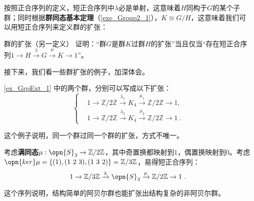 按照正合序列的定义，短正合序列中$\lambda$必是单射，这意味着$H$同构于$G$的某个子群；同时根据\textbf{群同态基本定理}（\autoref{exe_Group2_1}），$K\cong G/H$，这意味着我们可以用短正合序列来定义群的扩张：




\begin{exercise}{群的扩张（另一定义）}
证明：“群$G$是群$K$过群$H$的扩张”当且仅当“存在短正合序列$1\xrightarrow{}H\xrightarrow{\lambda}G\xrightarrow{\mu}K\xrightarrow{}1$”。
\end{exercise}



接下来，我们看一些群扩张的例子，加深体会。



\begin{example}{}

\autoref{ex_GrpExt_1} 中的两个群，分别可以写成以下扩张：
\begin{equation}
\left\{
\begin{aligned}
    &1\xrightarrow{}\mathbb{Z}/2\mathbb{Z}\xrightarrow{\lambda_1}K_4\xrightarrow{\mu_1}\mathbb{Z}/2\mathbb{Z}\xrightarrow{}1, \\
    &1\xrightarrow{}\mathbb{Z}/2\mathbb{Z}\xrightarrow{\lambda_2}K_4\xrightarrow{\mu_2}\mathbb{Z}/2\mathbb{Z}\xrightarrow{}1~. 
\end{aligned}
\right. 
\end{equation}

这个例子说明，同一个群过同一个群的扩张，方式不唯一。

\end{example}




\begin{example}{}
考虑\textbf{满同态}$\mu:\opn{S}_3\to\mathbb{Z}/2\mathbb{Z}$，其中奇置换都映射到$1$，偶置换映射到$0$。考虑$\opn{ker}\mu=\{(1), (1\ 2\ 3), (1\ 3\ 2)\}=\mathbb{Z}/3\mathbb{Z}$，易得短正合序列：
\begin{equation}
1\xrightarrow{}\mathbb{Z}/3\mathbb{Z}\xrightarrow{\lambda}\opn{S}_3\xrightarrow{\mu}\mathbb{Z}/2\mathbb{Z}\xrightarrow{}1~. 
\end{equation}

这个序列说明，结构简单的阿贝尔群也能扩张出结构复杂的非阿贝尔群。
\end{example}


